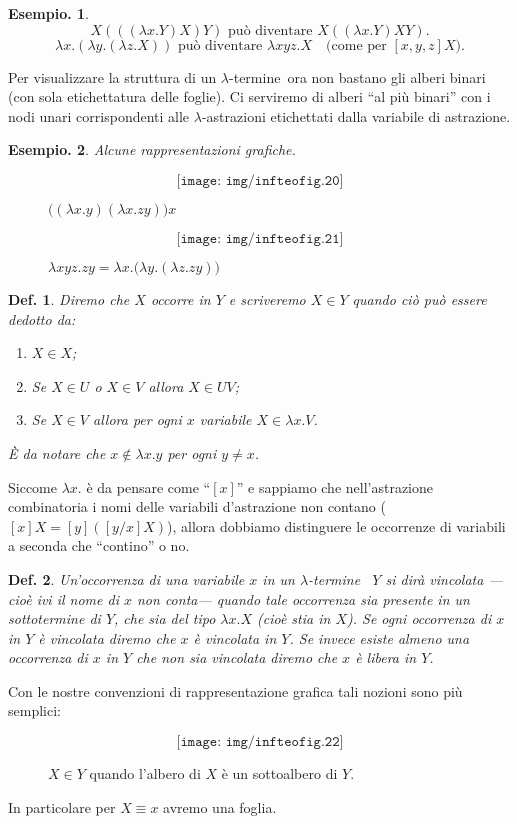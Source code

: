 \documentclass{book}
\newtheorem{definizione}{Def.}[chapter]
\newtheorem{esempio}{Esempio.}
\newcommand*{\lbt}{$\lambda$-ter\-mi\-ne}
\begin{document}
\begin{esempio}
\[
X(((\lambda x.Y)X)Y) \text{ pu\`o diventare } X((\lambda x.Y)XY).
\]
\[
\lambda x.(\lambda y.(\lambda z.X)) \text{ pu\`o diventare } \lambda xyz.X
\quad \text{(come per $[x,y,z]X$)}. 
\]

\end{esempio}

Per visualizzare la struttura di un \lbt ~ora non bastano gli alberi binari
(con sola etichettatura delle foglie). Ci serviremo di alberi 
``al pi\`u binari'' con i nodi unari corrispondenti alle $\lambda$-astrazioni
etichettati dalla variabile di astrazione.

\begin{esempio}Alcune rappresentazioni grafiche.
\begin{figure}[!ht]
\[\texttt{[image: img/infteofig.20]}\]
\caption{$\bigl((\lambda x.y)(\lambda x.zy)\bigr)x$}
\end{figure}
\begin{figure}[!ht]
\[\texttt{[image: img/infteofig.21]}\]
\caption{$\lambda xyz.zy = \lambda x.\bigl(\lambda y.(\lambda z.zy)\bigr)$}
\end{figure}
\end{esempio}

\begin{definizione}
Diremo che $X$ \emph{occorre} in $Y$ e scriveremo $X \in Y$ quando ci\`o pu\`o
essere dedotto da:
\begin{enumerate}
\item[-]$X \in X$;
\item[-]Se $X \in U$ o $X \in V$ allora $X \in UV$;
\item[-]Se $X \in V$ allora per ogni $x$ variabile $X \in \lambda x.V$.
\end{enumerate}
\`E da notare che $x \notin \lambda x.y$ per ogni $y \neq x$.
\end{definizione}
Siccome $\lambda x.$ \`e da pensare come ``$[x]$'' e sappiamo che 
nell'astrazione combinatoria i nomi delle variabili d'astrazione non contano
($[x]X = [y]([y/x]X)$), allora dobbiamo distinguere le occorrenze di variabili 
a seconda che ``contino'' o no.

\begin{definizione}
Un'occorrenza di una variabile $x$ in un \lbt~ $Y$ si dir\`a \emph{vincolata}
---cio\`e ivi il nome di $x$ non conta--- quando tale occorrenza sia presente 
in un sottotermine di $Y$, che sia del tipo $\lambda x.X$ (cio\`e stia in $X$).
Se ogni occorrenza di $x$ in $Y$ \`e vincolata diremo che $x$ \`e 
\emph{vincolata} in $Y$. Se invece esiste almeno una occorrenza di $x$ in $Y$
che non sia vincolata diremo che $x$ \`e \emph{libera} in $Y$.
\end{definizione}
Con le nostre convenzioni di rappresentazione grafica tali nozioni sono pi\`u
semplici:
\begin{figure}[!ht]
\[\texttt{[image: img/infteofig.22]}\]
\caption{$X \in Y$ quando l'albero di $X$ \`e un sottoalbero di $Y$.}
\end{figure}
In particolare per $X \equiv x$ avremo una foglia.
\end{document}
